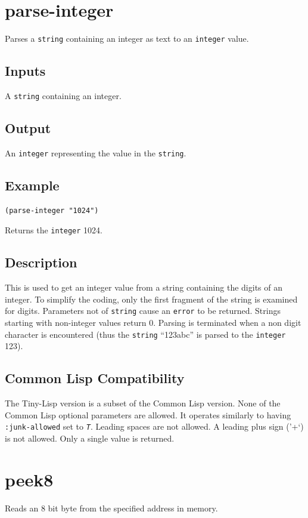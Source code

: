 \documentclass[10pt, openany]{book}
\newcommand{\constant}[1]{\emph{\texttt{#1}}}
\newcommand{\keyword}[1]{\texttt{#1}}
\newcommand{\datatype}[1]{\texttt{#1}}
\newcommand{\tl}{Tiny-Lisp}
\newcommand{\cl}{Common Lisp}
\begin{document}
\section{parse-integer}
Parses a \datatype{string} containing an integer as text to an \datatype{integer} value.
\subsection{Inputs}
A \datatype{string} containing an integer.
\subsection{Output}
An \datatype{integer} representing the value in the \datatype{string}.
\subsection{Example}
\begin{lstlisting}
(parse-integer "1024")
\end{lstlisting}
Returns the \datatype{integer} 1024.
\subsection{Description}
This is used to get an integer value from a string containing the digits of an integer.  To simplify the coding, only the first fragment of the string is examined for digits.  Parameters not of \datatype{string} cause an \keyword{error} to be returned.  Strings starting with non-integer values return 0.  Parsing is terminated when a non digit character is encountered (thus the \datatype{string} ``123abc'' is parsed to the \datatype{integer} 123).
\subsection{Common Lisp Compatibility}
The \tl{} version is a subset of the \cl{} version.  None of the \cl{} optional parameters are allowed.  It operates similarly to having \keyword{:junk-allowed} set to \constant{T}. Leading spaces are not allowed.  A leading plus sign ('+`) is not allowed.  Only a single value is returned.

\section{peek8}
Reads an 8 bit byte from the specified address in memory.
\end{document}
